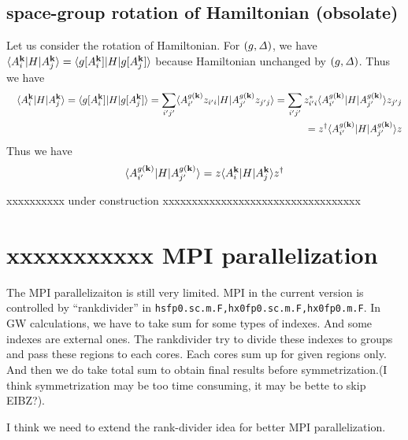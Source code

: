 \documentclass[a4paper,10pt,fleqn]{article}
\def\iDelta{{\it \Delta}}
\def\iDelta{{\it \Delta}}
\newcommand{\bfk}{{\bf k}}
\begin{document}
\subsection{space-group rotation of Hamiltonian (obsolate)}
Let us consider the rotation of Hamiltonian. For $(g,\iDelta)$, we have 
$\langle A^\bfk_i|H|A^\bfk_j \rangle=\langle g[A^\bfk_i]|H|g[A^\bfk_j] \rangle$ because 
Hamiltonian unchanged by $(g,\iDelta)$. Thus we have
\begin{eqnarray}
&&\langle A^\bfk_i|H|A^\bfk_j \rangle
= \langle g[A^\bfk_i]|H|g[A^\bfk_j] \rangle
= \sum_{i'j'} \langle A^{g(\bfk)}_{i'}z_{i'i} |H| A^{g(\bfk)}_{j'} z_{j'j} \rangle 
= \sum_{i'j'} z^*_{i'i} \langle A^{g(\bfk)}_{i'}|H| A^{g(\bfk)}_{j'}
\rangle z_{j'j} \nonumber \\
&&= z^\dagger \langle A^{g(\bfk)}_{i'}|H| A^{g(\bfk)}_{j'} \rangle z
\end{eqnarray}
Thus we have
\begin{eqnarray}
\langle A^{g(\bfk)}_{i'}|H| A^{g(\bfk)}_{j'} \rangle 
= z \langle A^\bfk_i|H|A^\bfk_j \rangle z^\dagger
\end{eqnarray}

 




\newpage
xxxxxxxxxx under construction xxxxxxxxxxxxxxxxxxxxxxxxxxxxxxxxxx\\
\section{xxxxxxxxxxx MPI parallelization}
The MPI parallelizaiton is still very limited.
MPI in the current version is controlled by ``rankdivider'' 
in \verb#hsfp0.sc.m.F,hx0fp0.sc.m.F,hx0fp0.m.F#.
In GW calculations, we have to take sum for some types of indexes. And
some indexes are external ones.
The rankdivider try to divide these indexes to groups and pass these
regions to each cores. Each cores sum up for given regions only.
And then we do take total sum to obtain final results before
symmetrization.(I think symmetrization may be too time consuming, 
it may be bette to skip EIBZ?).

I think we need to extend the rank-divider idea for better MPI parallelization.
\end{document}
